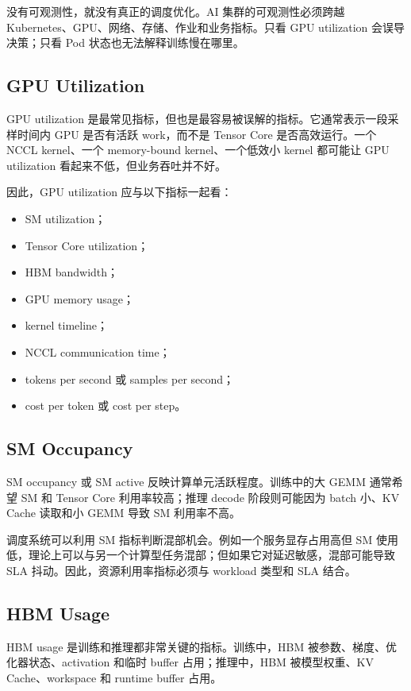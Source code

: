 没有可观测性，就没有真正的调度优化。AI 集群的可观测性必须跨越 Kubernetes、GPU、网络、存储、作业和业务指标。只看 GPU utilization 会误导决策；只看 Pod 状态也无法解释训练慢在哪里。

\subsection{GPU Utilization}
\label{subsec:gpu-utilization}

GPU utilization 是最常见指标，但也是最容易被误解的指标。它通常表示一段采样时间内 GPU 是否有活跃 work，而不是 Tensor Core 是否高效运行。一个 NCCL kernel、一个 memory-bound kernel、一个低效小 kernel 都可能让 GPU utilization 看起来不低，但业务吞吐并不好。

因此，GPU utilization 应与以下指标一起看：

\begin{itemize}
  \item SM utilization；
  \item Tensor Core utilization；
  \item HBM bandwidth；
  \item GPU memory usage；
  \item kernel timeline；
  \item NCCL communication time；
  \item tokens per second 或 samples per second；
  \item cost per token 或 cost per step。
\end{itemize}

\subsection{SM Occupancy}
\label{subsec:sm-occupancy-monitoring}

SM occupancy 或 SM active 反映计算单元活跃程度。训练中的大 GEMM 通常希望 SM 和 Tensor Core 利用率较高；推理 decode 阶段则可能因为 batch 小、KV Cache 读取和小 GEMM 导致 SM 利用率不高。

调度系统可以利用 SM 指标判断混部机会。例如一个服务显存占用高但 SM 使用低，理论上可以与另一个计算型任务混部；但如果它对延迟敏感，混部可能导致 SLA 抖动。因此，资源利用率指标必须与 workload 类型和 SLA 结合。

\subsection{HBM Usage}
\label{subsec:hbm-usage-monitoring}

HBM usage 是训练和推理都非常关键的指标。训练中，HBM 被参数、梯度、优化器状态、activation 和临时 buffer 占用；推理中，HBM 被模型权重、KV Cache、workspace 和 runtime buffer 占用。

